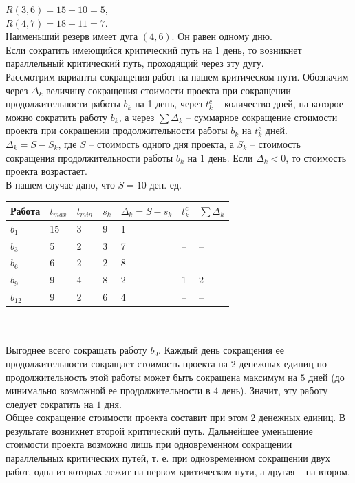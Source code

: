 \documentclass[a4paper, 12pt]{report}
\begin{document}
	$R(3,6)=15-10=5$,\\
	$R(4,7)=18-11=7$.\\
	Наименьший резерв имеет дуга $(4,6)$. Он равен одному дню.\\
	Если сократить имеющийся критический путь на 1 день, то возникнет параллельный
	критический путь, проходящий через эту дугу. \\
	Рассмотрим варианты сокращения работ на нашем критическом
	пути. Обозначим через $\Delta_k$ величину сокращения стоимости проекта
	при сокращении продолжительности работы $b_k$ на 1 день, через $t_k^c$ --
	количество дней, на которое можно сократить работу $b_k$, а через $\sum \Delta_k$ -- суммарное сокращение стоимости проекта при сокращении продолжительности работы $b_k$ на $t_k^c$ дней. \\
	$\Delta_k=S-S_k$, где $S$ -- стоимость одного дня проекта, а $S_k$ -- стоимость сокращения продолжительности работы $b_k$ на 1 день. Если $\Delta_k<0$, то стоимость проекта возрастает.\\
	В нашем случае дано, что $S=10$ ден. ед.\\
	\begin{tabular}{ |p{2cm}||p{1cm}||p{1cm}||p{1cm}||p{3cm}||p{1cm}||p{2cm}|}
		\hline
		Работа & $t_{max}$ & $t_{min}$ & $s_k$ & $\Delta_k=S-s_k$ & $t_k^c$& $\sum \Delta_k$\\
		\hline
		$b_1$ & 15 & 3 & 9 & 1 & -- & --\\
		$b_3$ & 5 & 2 & 3 & 7 & -- & --\\
		$b_6$ & 6 & 2 & 2 & 8 & -- & --\\
		$b_9$ & 9 & 4 & 8 & 2 & 1 & 2\\
		$b_{12}$ & 9 & 2 & 6 & 4 &  -- & --\\
		\hline
	\end{tabular}\\\\
	Выгоднее всего сокращать работу $b_{9}$. Каждый день сокращения ее
	продолжительности сокращает стоимость проекта на $2$ денежных
	единиц но продолжительность этой работы может быть сокращена
	максимум на $5$ дней (до минимально возможной ее продолжительности в $4$ день). Значит, эту работу следует сократить на $1$ дня.
	\\
	Общее сокращение стоимости проекта составит при этом $2$  денежных единиц. В результате возникнет второй критический путь. Дальнейшее уменьшение стоимости проекта возможно лишь при одновременном сокращении параллельных критических путей, т. е. при одновременном сокращении двух работ, одна из которых лежит на первом критическом пути, а другая -- на втором.
\end{document}
